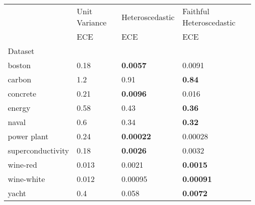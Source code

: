 \begin{tabular}{l|l|l|l}
\toprule
 & Unit Variance & Heteroscedastic & Faithful Heteroscedastic \\
 & ECE & ECE & ECE \\
Dataset &  &  &  \\
\midrule
boston & 0.18 & \bfseries 0.0057 & 0.0091 \\
carbon & 1.2 & 0.91 & \bfseries 0.84 \\
concrete & 0.21 & \bfseries 0.0096 & 0.016 \\
energy & 0.58 & 0.43 & \bfseries 0.36 \\
naval & 0.6 & 0.34 & \bfseries 0.32 \\
power plant & 0.24 & \bfseries 0.00022 & 0.00028 \\
superconductivity & 0.18 & \bfseries 0.0026 & 0.0032 \\
wine-red & 0.013 & 0.0021 & \bfseries 0.0015 \\
wine-white & 0.012 & 0.00095 & \bfseries 0.00091 \\
yacht & 0.4 & 0.058 & \bfseries 0.0072 \\
\bottomrule
\end{tabular}
